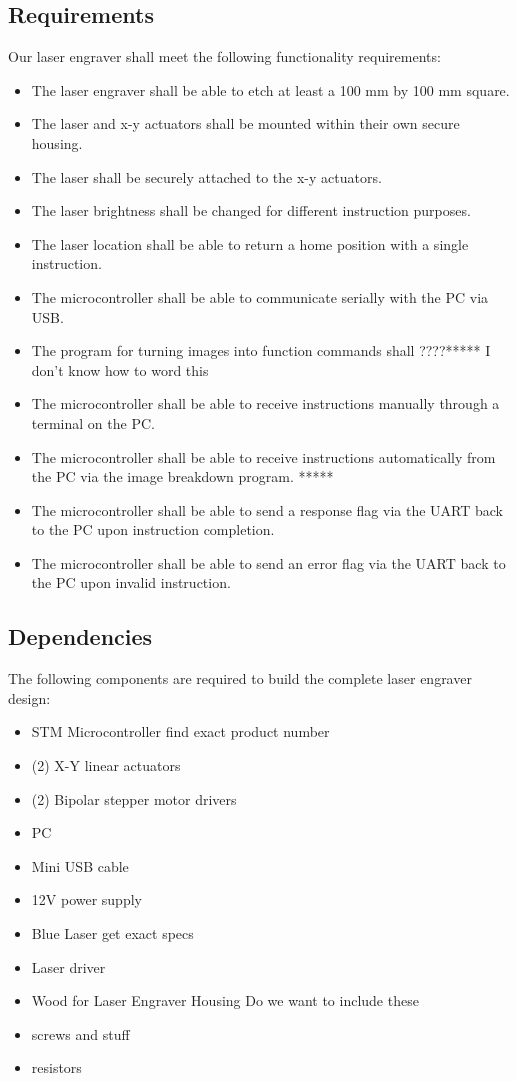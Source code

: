 \documentclass[11pt]{LaTeX-Classes/math-hw}
\begin{document}
\subsection{Requirements}
Our laser engraver shall meet the following functionality requirements:
\begin{itemize}
	\item The laser engraver shall be able to etch at least a 100 mm by 100 mm square.
	\item The laser and x-y actuators shall be mounted within their own secure housing.
	\item The laser shall be securely attached to the x-y actuators.
	\item The laser brightness shall be changed for different instruction purposes.
	\item The laser location shall be able to return a home position with a single instruction.
	\item The microcontroller shall be able to communicate serially with the PC via USB.
	\item The program for turning images into function commands shall ????***** I don't know how to word this 
	\item The microcontroller shall be able to receive instructions manually through a terminal on the PC.
	\item The microcontroller shall be able to receive instructions automatically from the PC via the image breakdown program. *****
	\item The microcontroller shall be able to send a response flag via the UART back to the PC upon instruction completion.
	\item The microcontroller shall be able to send an error flag via the UART back to the PC upon invalid instruction.
	
\end{itemize}

\subsection{Dependencies}
The following components are required to build the complete laser engraver design:
\begin{itemize}
	\item STM Microcontroller find exact product number
	\item (2) X-Y linear actuators
	\item (2) Bipolar stepper motor drivers
	\item PC
	\item Mini USB cable
	\item 12V power supply
	\item Blue Laser get exact specs
	\item Laser driver
	\item Wood for Laser Engraver Housing Do we want to include these
	\item screws and stuff
	\item resistors
	\end{itemize}
\end{document}
